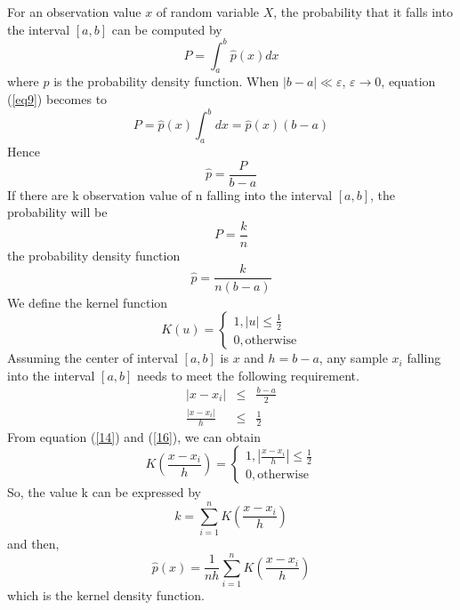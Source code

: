\documentclass[11pt]{report}
\begin{document}
	For an observation value $x$ of random variable $X$, the probability that it falls into the interval $[a, b]$ can be computed by
	\begin{equation}
	\label{eq9}
	P = \int_{a}^{b}\hat{p}\left(x\right)dx
	\end{equation}
	where $\hat{p}$ is the probability density function. When $|b-a|\ll \varepsilon$, $\varepsilon \to 0$, equation (\ref{eq9}) becomes to 
	\begin{equation}
	P = \hat{p}\left(x\right)\int_{a}^{b}dx = \hat{p}\left(x\right)\left(b-a\right)
	\end{equation}
	Hence
	\begin{equation}
	\hat{p} = \frac{P}{b-a}
	\end{equation}
	If there are k observation value of n falling into the interval $[a, b]$, the probability will be 
	\begin{equation}
	P = \frac{k}{n}
	\end{equation}
	the probability density function
	\begin{equation}
	\hat{p} = \frac{k}{n\left(b-a\right)}
	\end{equation}
	We define the kernel function
	\begin{equation}
	\label{14}
	K\left(u\right)  = \left\{ \begin{array}{ll}
	1, |u|\leq\frac{1}{2}\\
	0, \text{otherwise}
	\end{array} \right.
	\end{equation}
	Assuming the center of interval $[a,b]$ is $x$ and $h=b-a$, any sample $x_i$ falling into the interval $[a, b]$ needs to meet the following requirement.
	\begin{eqnarray}
	|x-x_i| &\leq& \frac{b-a}{2}\\
	\label{16}
	\frac{|x-x_i|}{h} &\leq& \frac{1}{2}
	\end{eqnarray}
	From equation (\ref{14}) and (\ref{16}), we can obtain
	\begin{equation}
	K\left(\frac{x-x_i}{h}\right) = \left\{ \begin{array}{ll}
	1, |\frac{x-x_i}{h}| \leq \frac{1}{2}\\
	0, \text{otherwise}
	\end{array} \right.
	\end{equation}
	So, the value k can be expressed by 
	\begin{equation}
	k = \sum_{i=1}^{n}K\left(\frac{x-x_i}{h}\right)
	\end{equation}
	and then, 
	\begin{equation}
	\label{19}
	\hat{p}\left(x\right)=\frac{1}{nh}\sum_{i=1}^{n}K\left(\frac{x-x_i}{h}\right)
	\end{equation}
	which is the kernel density function. 
	
\end{document}
